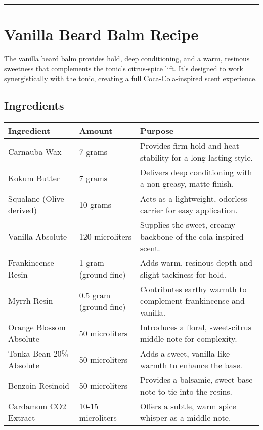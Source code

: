\documentclass{article}
\begin{document}
\vspace{1em}
\hrule
\vspace{1em}

\section*{Vanilla Beard Balm Recipe}

The vanilla beard balm provides hold, deep conditioning, and a warm, resinous sweetness that complements the tonic's citrus-spice lift. It's designed to work synergistically with the tonic, creating a full Coca-Cola-inspired scent experience.

\subsection*{Ingredients}

\begin{center}
\begin{tabular}{p{4.5cm} p{2.5cm} p{8cm}}
\toprule
\textbf{Ingredient} & \textbf{Amount} & \textbf{Purpose} \\
\midrule
Carnauba Wax & 7 grams & Provides firm hold and heat stability for a long-lasting style. \\
Kokum Butter & 7 grams & Delivers deep conditioning with a non-greasy, matte finish. \\
Squalane (Olive-derived) & 10 grams & Acts as a lightweight, odorless carrier for easy application. \\
Vanilla Absolute & 120 microliters & Supplies the sweet, creamy backbone of the cola-inspired scent. \\
Frankincense Resin & 1 gram (ground fine) & Adds warm, resinous depth and slight tackiness for hold. \\
Myrrh Resin & 0.5 gram (ground fine) & Contributes earthy warmth to complement frankincense and vanilla. \\
Orange Blossom Absolute & 50 microliters & Introduces a floral, sweet-citrus middle note for complexity. \\
Tonka Bean 20\% Absolute & 50 microliters & Adds a sweet, vanilla-like warmth to enhance the base. \\
Benzoin Resinoid & 50 microliters & Provides a balsamic, sweet base note to tie into the resins. \\
Cardamom CO2 Extract & 10-15 microliters & Offers a subtle, warm spice whisper as a middle note. \\
\bottomrule
\end{tabular}
\end{center}
\end{document}
